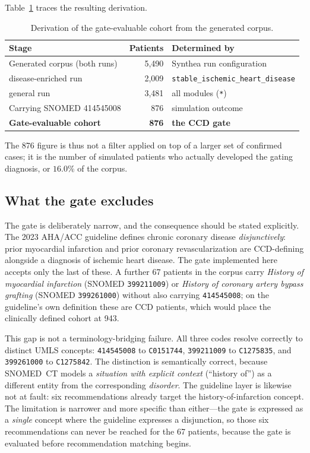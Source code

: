 Table~\ref{tab:cohort-funnel} traces the resulting derivation.

\begin{table}[h]
\centering
\caption{Derivation of the gate-evaluable cohort from the generated corpus.}
\label{tab:cohort-funnel}
\begin{tabular}{lrl}
\hline
\textbf{Stage} & \textbf{Patients} & \textbf{Determined by} \\
\hline
Generated corpus (both runs)      & 5{,}490 & Synthea run configuration \\
\quad disease-enriched run        & 2{,}009 & \texttt{stable\_ischemic\_heart\_disease} \\
\quad general run                 & 3{,}481 & all modules (\texttt{*}) \\
Carrying SNOMED 414545008         &    876  & simulation outcome \\
\textbf{Gate-evaluable cohort}    & \textbf{876} & \textbf{the CCD gate} \\
\hline
\end{tabular}
\end{table}

The 876 figure is thus not a filter applied on top of a larger set of confirmed cases; it is
the number of simulated patients who actually developed the gating diagnosis, or
$16.0\%$ of the corpus.

\subsection{What the gate excludes}
The gate is deliberately narrow, and the consequence should be stated explicitly. The 2023
AHA/ACC guideline defines chronic coronary disease \emph{disjunctively}: prior myocardial
infarction and prior coronary revascularization are CCD-defining alongside a diagnosis of
ischemic heart disease. The gate implemented here accepts only the last of these. A further
67 patients in the corpus carry \emph{History of myocardial infarction} (SNOMED
\texttt{399211009}) or \emph{History of coronary artery bypass grafting} (SNOMED
\texttt{399261000}) without also carrying \texttt{414545008}; on the guideline's own
definition these are CCD patients, which would place the clinically defined cohort at 943.

This gap is not a terminology-bridging failure. All three codes resolve correctly to distinct UMLS concepts: \texttt{414545008} to
\texttt{C0151744}, \texttt{399211009} to \texttt{C1275835}, and \texttt{399261000} to
\texttt{C1275842}. The distinction is semantically correct, because SNOMED~CT models a
\emph{situation with explicit context} (``history of'') as a different entity from the
corresponding \emph{disorder}. The guideline
layer is likewise not at fault: six recommendations already target the history-of-infarction
concept. The limitation is narrower and more specific than either---the gate is expressed as
a \emph{single} concept where the guideline expresses a disjunction, so those six
recommendations can never be reached for the 67 patients, because the gate is evaluated
before recommendation matching begins.

